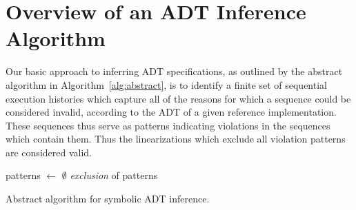\section{Overview of an ADT Inference Algorithm}
\label{sec:overview}

Our basic approach to inferring ADT specifications, as outlined by the abstract
algorithm in Algorithm~\ref{alg:abstract}, is to identify a finite set of
sequential execution histories which capture all of the reasons for which a
sequence could be considered invalid, according to the ADT of a given reference
implementation. These sequences thus serve as patterns indicating violations in
the sequences which contain them. Thus the linearizations which exclude all
violation patterns are considered valid.

\begin{algorithm}[t]
  \SetAlgoLined
  patterns $\gets$ $\emptyset$ \;
  \Return \emph{exclusion} of patterns
  \caption{Abstract algorithm for symbolic ADT inference.}
  \label{alg:abstract}
\end{algorithm}

